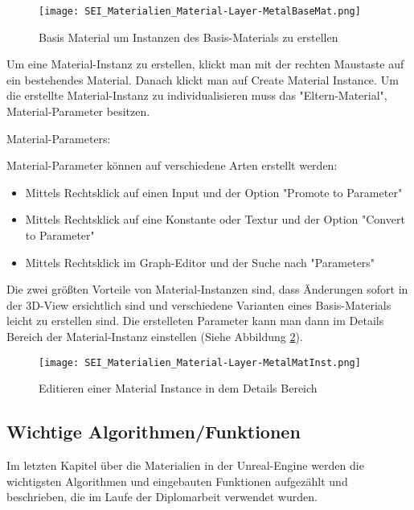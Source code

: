 \begin{figure}[h]
    \centering
    \texttt{[image: SEI\_Materialien\_Material-Layer-MetalBaseMat.png]}
    \caption{Basis Material um Instanzen des Basis-Materials zu erstellen}
    \label{picture:base_metal_material}
\end{figure}

Um eine Material-Instanz zu erstellen, klickt man mit der rechten Maustaste auf ein bestehendes Material. Danach klickt
man auf Create Material Instance. Um die erstellte Material-Instanz zu individualisieren muss das "Eltern-Material",
Material-Parameter besitzen.

Material-Parameters:

    Material-Parameter können auf verschiedene Arten  erstellt werden:
    \begin{itemize}
        \item  Mittels Rechtsklick auf einen Input und der Option "Promote to Parameter"
        \item  Mittels Rechtsklick auf eine Konstante oder Textur und der Option "Convert to Parameter"
        \item  Mittels Rechtsklick im Graph-Editor und der Suche nach "Parameters"
    \end{itemize}

Die zwei größten Vorteile von Material-Instanzen sind, dass Änderungen sofort in der 3D-View ersichtlich sind und
verschiedene Varianten eines Basis-Materials leicht zu erstellen sind. Die erstelleten Parameter kann man dann im
Details Bereich der Material-Instanz einstellen (Siehe Abbildung \ref{picture:edit_mat_instance}).

\begin{figure}[h]
    \centering
    \texttt{[image: SEI\_Materialien\_Material-Layer-MetalMatInst.png]}
    \caption{Editieren einer Material Instance in dem Details Bereich}
    \label{picture:edit_mat_instance}
\end{figure}

\subsection{Wichtige Algorithmen/Funktionen}
\label{sec:algorithms}

Im letzten Kapitel über die Materialien in der Unreal-Engine werden die wichtigsten Algorithmen und eingebauten
Funktionen aufgezählt und beschrieben, die im Laufe der Diplomarbeit verwendet wurden.

